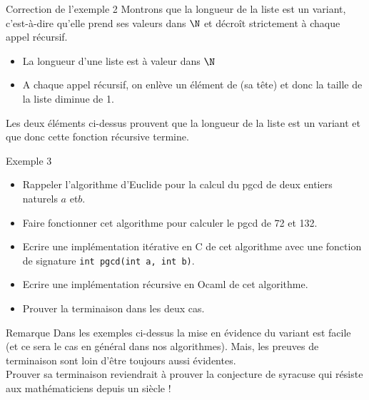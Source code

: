 \documentclass[10pt]{beamer}
\begin{document}
    \begin{frame}[fragile]{\Ctitle}{\stitle}
    \begin{exampleblock}{Correction de l'exemple 2}
        \textcolor{OliveGreen}{Montrons que la longueur de la liste  est un variant, c'est-à-dire qu'elle prend ses valeurs dans $\N$ et  décroît strictement à chaque appel récursif.}
        \begin{itemize}
            \item<2->{\textcolor{OliveGreen}{La longueur d'une liste est à valeur dans $\N$}}
            \item<3->{\textcolor{OliveGreen}{A chaque appel récursif, on enlève un élément de  (sa tête) et donc la taille de la liste diminue de 1.}}
        \end{itemize}
        \textcolor{OliveGreen}{Les deux éléments ci-dessus prouvent que la longueur de la liste est un variant et que donc cette fonction récursive termine.}
    \end{exampleblock}
    \end{frame}

    \begin{frame}[fragile]{\Ctitle}{\stitle}
        \begin{exampleblock}{Exemple 3}
            \begin{itemize}
                \item<1-> Rappeler l'algorithme d'Euclide pour la calcul du {\sc pgcd} de deux entiers naturels $a$ et$b$.
                \item<2-> Faire fonctionner cet algorithme pour calculer le {\sc pgcd} de 72 et 132.
                \item<3-> Ecrire une implémentation itérative en C de cet algorithme avec une fonction de signature \texttt{int pgcd(int a, int b)}.
                \item<4-> Ecrire une implémentation récursive en Ocaml de cet algorithme.
                \item<5-> Prouver la terminaison dans les deux cas.
            \end{itemize}
        \end{exampleblock}
        \end{frame}

    \begin{frame}[fragile]{\Ctitle}{\stitle}
        \begin{block}{Remarque}
            Dans les exemples ci-dessus la mise en évidence du variant est facile (et ce sera le cas en général dans nos algorithmes). Mais, les preuves de terminaison sont loin d'être toujours aussi évidentes.\\
             Prouver sa terminaison reviendrait à prouver la conjecture de syracuse qui résiste aux mathématiciens depuis un siècle !
        \end{block}
    \end{frame}
\end{document}
